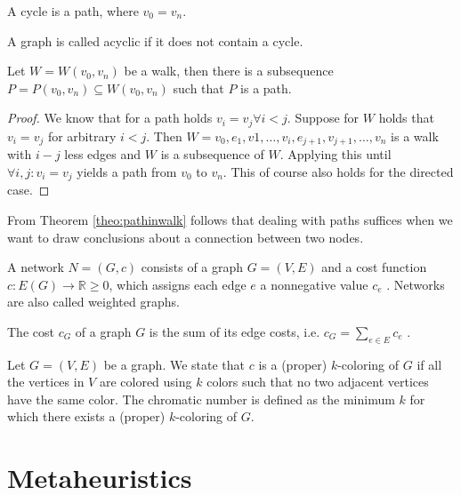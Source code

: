 \begin{definition}[Cycle]
A cycle is a path, where $v_0 = v_n$.
\end{definition}

\begin{definition}
A graph is called acyclic if it does not contain a cycle.
\end{definition}

\begin{theorem}
Let $W = W(v_0,v_n)$ be a walk, then there is a subsequence $P = P(v_0,v_n) \subseteq W(v_0,v_n)$ such that $P$ is a path.
\label{theo:pathinwalk}
\end{theorem}
\begin{proof}
We know that for a path holds $v_i = v_j \forall i < j$. Suppose for $W$ holds that $v_i = v_j$ for arbitrary $i < j$. Then $W = v_0,e_1,v1,\ldots,v_i,e_{j+1},v_{j+1},\ldots,v_n$ is a walk with $i-j$ less edges and $W$ is a subsequence of $W$. Applying this until $\forall i, j : v_i = v_j$ yields a path from $v_0$ to $v_n$. This of course also holds for the directed case.
\end{proof}

From Theorem \ref{theo:pathinwalk} follows that dealing with paths suffices when we want to draw conclusions about a connection between two nodes.

\begin{definition}[Network]
A network $N = (G, c)$ consists of a graph $G = (V, E)$ and a cost function $c : E(G) \longrightarrow \mathbb{R} \geq 0$, which assigns each edge $e$ a nonnegative value $c_e$ . Networks are also called weighted graphs.
\end{definition}

\begin{definition}
The cost $c_G$ of a graph $G$ is the sum of its edge costs, i.e. $c_G = \sum_{e\in E}c_e$ .
\end{definition}


\begin{definition}
Let $G = (V, E)$ be a graph. We state that $c$ is a (proper) $k$-coloring of $G$ if all the vertices in $V$ are colored using $k$ colors such that no two adjacent vertices have the same color. The chromatic number is defined as the minimum $k$ for which there exists a (proper) $k$-coloring of $G$.
\end{definition}

\section{Metaheuristics}



